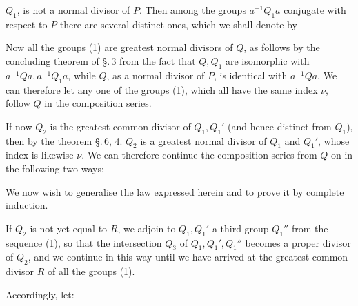 
$Q_1$, is not a normal divisor of $P$. Then among the groups $a^{-1} Q_1 a$ conjugate with respect to $P$ there are several distinct ones, which we shall denote by



Now all the groups (1) are greatest normal divisors of $Q$, as follows by the concluding theorem of \S.\,3 from the fact that $Q, Q_1$ are isomorphic with $a^{-1} Q a, a^{-1} Q_1 a$, while $Q$, as a normal divisor of $P$, is identical with $a^{-1} Q a$. We can therefore let any one of the groups (1), which all have the same index $\nu$, follow $Q$ in the composition series.

If now $Q_2$ is the greatest common divisor of $Q_1, Q_1'$ (and hence distinct from $Q_1$), then by the theorem \S.\,6, 4. $Q_2$ is a greatest normal divisor of $Q_1$ and $Q_1'$, whose index is likewise $\nu$. We can therefore continue the composition series from $Q$ on in the following two ways:


We now wish to generalise the law expressed herein and to prove it by complete induction.

If $Q_2$ is not yet equal to $R$, we adjoin to $Q_1, Q_1'$ a third group $Q_1''$ from the sequence (1), so that the intersection $Q_3$ of $Q_1, Q_1', Q_1''$ becomes a proper divisor of $Q_2$, and we continue in this way until we have arrived at the greatest common divisor $R$ of all the groups (1).

Accordingly, let:


